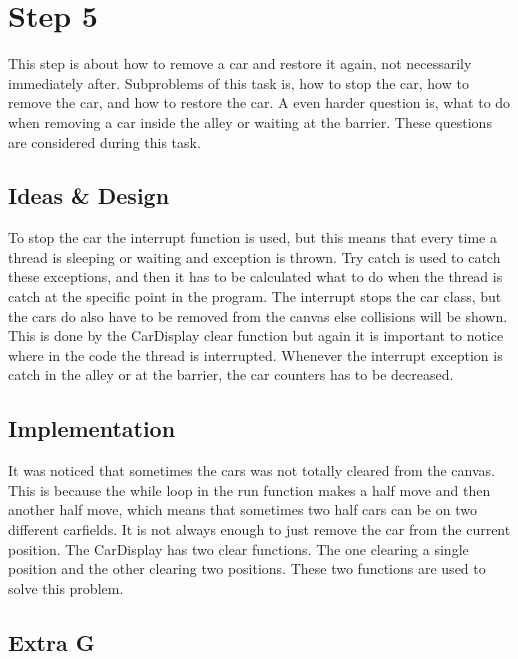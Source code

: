 \section{Step 5}
This step is about how to remove a car and restore it again, not necessarily immediately after. Subproblems of this task is, how to stop the car, how to remove the car, and how to restore the car. A even harder question is, what to do when removing a car inside the alley or waiting at the barrier. These questions are considered during this task.

\subsection{Ideas \& Design}
To stop the car the interrupt function is used, but this means that every time a thread is sleeping or waiting and exception is thrown. Try catch is used to catch these exceptions, and then it has to be calculated what to do when the thread is catch at the specific point in the program. The interrupt stops the car class, but the cars do also have to be removed from the canvas else collisions will be shown. This is done by the CarDisplay clear function but again it is important to notice where in the code the thread is interrupted. Whenever the interrupt exception is catch in the alley or at the barrier, the car counters has to be decreased.

\subsection{Implementation}
It was noticed that sometimes the cars was not totally cleared from the canvas. This is because the while loop in the run function makes a half move and then another half move, which means that sometimes two half cars can be on two different carfields. It is not always enough to just remove the car from the current position. The CarDisplay has two clear functions. The one clearing a single position and the other clearing two positions. These two functions are used to solve this problem.

\subsection{Extra G}
